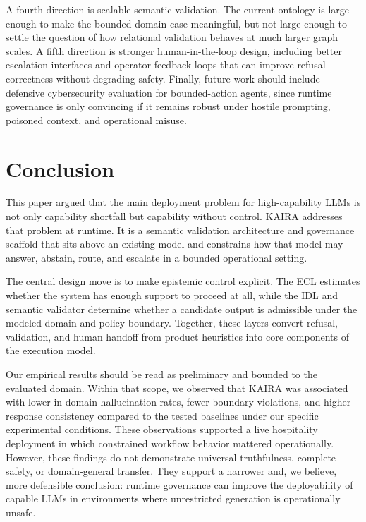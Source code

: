 \documentclass[11pt,a4paper]{article}
\begin{document}
A fourth direction is scalable semantic validation. The current ontology is large enough to make the bounded-domain case meaningful, but not large enough to settle the question of how relational validation behaves at much larger graph scales. A fifth direction is stronger human-in-the-loop design, including better escalation interfaces and operator feedback loops that can improve refusal correctness without degrading safety. Finally, future work should include defensive cybersecurity evaluation for bounded-action agents, since runtime governance is only convincing if it remains robust under hostile prompting, poisoned context, and operational misuse.

\section{Conclusion}

This paper argued that the main deployment problem for high-capability LLMs is not only capability shortfall but capability without control. KAIRA addresses that problem at runtime. It is a semantic validation architecture and governance scaffold that sits above an existing model and constrains how that model may answer, abstain, route, and escalate in a bounded operational setting.

The central design move is to make epistemic control explicit. The ECL estimates whether the system has enough support to proceed at all, while the IDL and semantic validator determine whether a candidate output is admissible under the modeled domain and policy boundary. Together, these layers convert refusal, validation, and human handoff from product heuristics into core components of the execution model.

Our empirical results should be read as preliminary and bounded to the evaluated domain. Within that scope, we observed that KAIRA was associated with lower in-domain hallucination rates, fewer boundary violations, and higher response consistency compared to the tested baselines under our specific experimental conditions. These observations supported a live hospitality deployment in which constrained workflow behavior mattered operationally. However, these findings do not demonstrate universal truthfulness, complete safety, or domain-general transfer. They support a narrower and, we believe, more defensible conclusion: runtime governance can improve the deployability of capable LLMs in environments where unrestricted generation is operationally unsafe.
\end{document}
